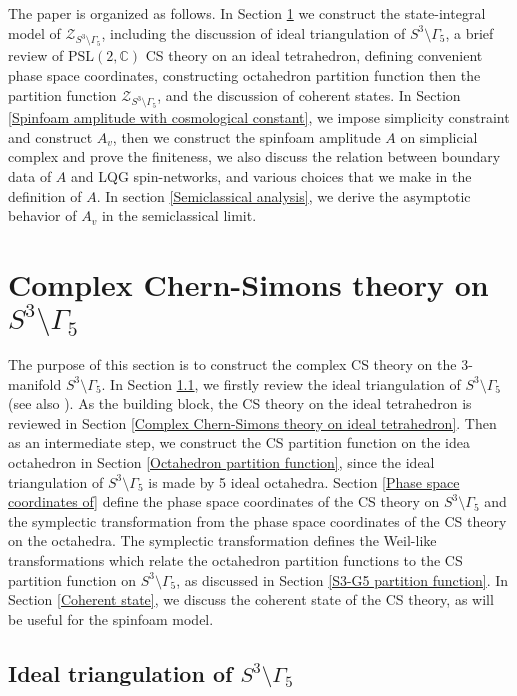 \documentclass[aps,prd,notitlepage,nofootinbib,superscriptaddress,groupedaddress,twocolumn]{revtex4-1}
\newcommand{\PSlc}{\mathrm{PSL}(2,\mathbb{C})}
\newcommand{\cz}{\mathcal Z}
\newcommand{\G}{\Gamma}
\begin{document}
The paper is organized as follows. In Section \ref{Complex Chern-Simons theory} we construct the state-integral model of $\cz_{S^3\setminus\G_5}$, including the discussion of ideal triangulation of $S^3\setminus\G_5$, a brief review of $\PSlc$ CS theory on an ideal tetrahedron, defining convenient phase space coordinates, constructing octahedron partition function then the partition function $\cz_{S^3\setminus\G_5}$, and the discussion of coherent states. In Section \ref{Spinfoam amplitude with cosmological constant}, we impose simplicity constraint and construct $A_v$, then we construct the spinfoam amplitude $A$ on simplicial complex and prove the finiteness, we also discuss the relation between boundary data of $A$ and LQG spin-networks, and various choices that we make in the definition of $A$. In section \ref{Semiclassical analysis}, we derive the asymptotic behavior of $A_v$ in the semiclassical limit.   






\section{Complex Chern-Simons theory on $S^3\setminus\G_5$}\label{Complex Chern-Simons theory}


The purpose of this section is to construct the complex CS theory on the 3-manifold $S^3\setminus\G_5$. In Section \ref{Ideal triangulation of},  we firstly review the ideal triangulation of $S^3\setminus\G_5$ (see also \cite{hanSUSY}). As the building block, the CS theory on the ideal tetrahedron is reviewed in Section \ref{Complex Chern-Simons theory on ideal tetrahedron}. Then as an intermediate step, we construct the CS partition function on the idea octahedron in Section \ref{Octahedron partition function}, since the ideal triangulation of $S^3\setminus\G_5$ is made by 5 ideal octahedra. Section \ref{Phase space coordinates of} define the phase space coordinates of the CS theory on $S^3\setminus\G_5$ and the symplectic transformation from the phase space coordinates of the CS theory on the octahedra. The symplectic transformation defines the Weil-like transformations which relate the octahedron partition functions to the CS partition function on $S^3\setminus\G_5$, as discussed in Section \ref{S3-G5 partition function}. In Section \ref{Coherent state}, we discuss the coherent state of the CS theory, as will be useful for the spinfoam model. 



\subsection{Ideal triangulation of $S^3\setminus\G_5$}\label{Ideal triangulation of}
\end{document}
